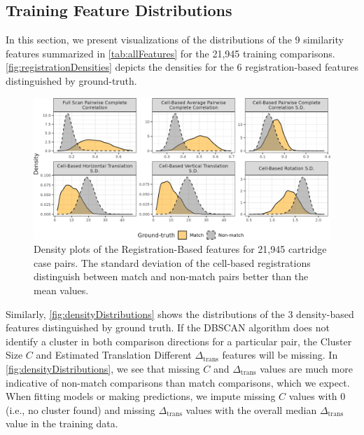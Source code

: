\documentclass[reprint]{JASA}
\begin{document}
\begin{appendices}

\section{Training Feature Distributions}

In this section, we present visualizations of the distributions of the 9 similarity features summarized in \autoref{tab:allFeatures} for the 21,945 training comparisons.
\autoref{fig:registrationDensities} depicts the densities for the 6 registration-based features distinguished by ground-truth.

\begin{figure}[htbp]
\includegraphics[width=.5\textwidth]{images/resultsPlots/featureDensity_registration} \caption{Density plots of the Registration-Based features for 21,945 cartridge case pairs. The standard deviation of the cell-based registrations distinguish between match and non-match pairs better than the mean values.}\label{fig:registrationDensities}
\end{figure}

Similarly, \autoref{fig:densityDistributions} shows the distributions of the 3 density-based features distinguished by ground truth.
If the DBSCAN algorithm does not identify a cluster in both comparison directions for a particular pair, the Cluster Size $C$ and Estimated Translation Different $\Delta_{\text{trans}}$ features will be missing.
In \autoref{fig:densityDistributions}, we see that missing $C$ and $\Delta_{\text{trans}}$ values are much more indicative of non-match comparisons than match comparisons, which we expect.
When fitting models or making predictions, we impute missing $C$ values with 0 (i.e., no cluster found) and missing $\Delta_{\text{trans}}$ values with the overall median $\Delta_{\text{trans}}$ value in the training data.


\end{appendices}
\end{document}
